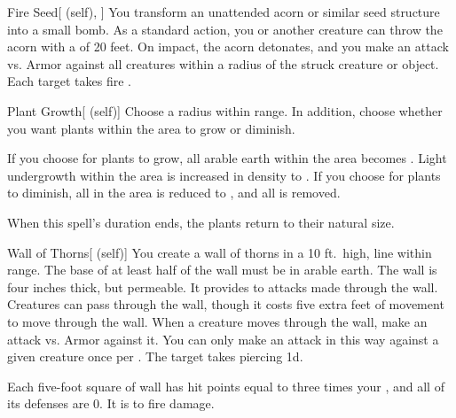 \lowercase{\hypertarget{spell:Fire Seed}{}}\label{spell:Fire Seed}
\begin{attuneability}[\nth{2}]{\hypertarget{spell:Fire Seed}{Fire Seed}}[ (self), ]
You transform an unattended acorn or similar seed structure into a small bomb.
As a standard action, you or another creature can throw the acorn with a  of 20 feet.
On impact, the acorn detonates, and you make an attack vs. Armor against all creatures within a \areasmall radius of the struck creature or object.
\hit Each target takes fire .
\end{attuneability}
\vspace{0.25em}



\lowercase{\hypertarget{spell:Plant Growth}{}}\label{spell:Plant Growth}
\begin{attuneability}[\nth{2}]{\hypertarget{spell:Plant Growth}{Plant Growth}}[ (self)]
Choose a \arealarge radius within \rnglong range.
In addition, choose whether you want plants within the area to grow or diminish.

If you choose for plants to grow, all arable earth within the area becomes .
Light undergrowth within the area is increased in density to .
If you choose for plants to diminish, all  in the area is reduced to , and all  is removed.

When this spell's duration ends, the plants return to their natural size.
\end{attuneability}
\vspace{0.25em}



\lowercase{\hypertarget{spell:Wall of Thorns}{}}\label{spell:Wall of Thorns}
\begin{attuneability}[\nth{2}]{\hypertarget{spell:Wall of Thorns}{Wall of Thorns}}[ (self)]
You create a wall of thorns in a 10 ft.\ high, \areamed line within \rngmed range.
The base of at least half of the wall must be in arable earth.
The wall is four inches thick, but permeable.
It provides  to attacks made through the wall.
Creatures can pass through the wall, though it costs five extra feet of movement to move through the wall.
When a creature moves through the wall, make an attack vs. Armor against it.
You can only make an attack in this way against a given creature once per .
\hit The target takes piercing  \minus1d.

Each five-foot square of wall has hit points equal to three times your , and all of its defenses are 0.
It is  to fire damage.
\end{attuneability}
\vspace{0.25em}



